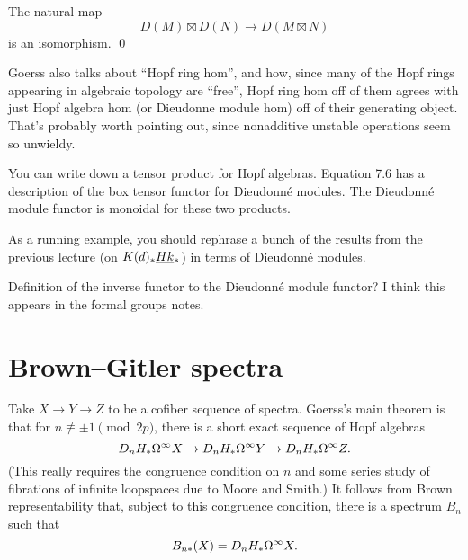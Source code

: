 \begin{theorem}
The natural map \[D(M) \boxtimes D(N) \to D(M \boxtimes N)\] is an isomorphism. \qed
\end{theorem}

Goerss also talks about ``Hopf ring hom'', and how, since many of the Hopf rings appearing in algebraic topology are ``free'', Hopf ring hom off of them agrees with just Hopf algebra hom (or Dieudonne module hom) off of their generating object.  That's probably worth pointing out, since nonadditive unstable operations seem so unwieldy.


You can write down a tensor product for Hopf algebras.  Equation 7.6 has a description of the box tensor functor for Dieudonn\'e modules.  The Dieudonn\'e module functor is monoidal for these two products.


As a running example, you should rephrase a bunch of the results from the previous lecture (on $K(d)_* \smash{\underline{Hk}}_{*}$) in terms of Dieudonn\'e modules.

\begin{remark}
\end{remark}


Definition of the inverse functor to the Dieudonn\'e module functor?  I think this appears in the formal groups notes.







\section{Brown--Gitler spectra}

Take $X \to Y \to Z$ to be a cofiber sequence of spectra.  Goerss's main theorem is that for $n \not\equiv \pm 1 \pmod{2p}$, there is a short exact sequence of Hopf algebras \[D_n H_* \Omega^\infty X \to D_n H_* \Omega^\infty Y \to D_n H_* \Omega^\infty Z.\]  (This really requires the congruence condition on $n$ and some series study of fibrations of infinite loopspaces due to Moore and Smith.)  It follows from Brown representability that, subject to this congruence condition, there is a spectrum $B_n$ such that \[B_{n*}(X) = D_n H_* \Omega^\infty X.\]




